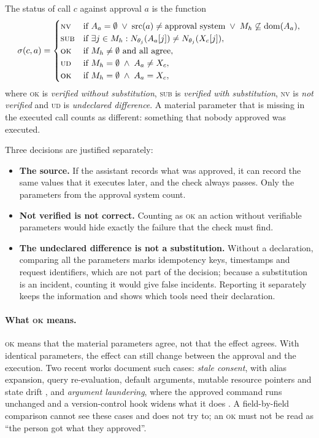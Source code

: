 \documentclass[11pt,a4paper]{article}
\begin{document}
The status of call $c$ against approval $a$ is the function
\begin{equation}
  \sigma(c,a) =
  \begin{cases}
    \textsc{nv} & \text{if } A_a = \emptyset \;\vee\; \mathrm{src}(a) \neq \text{approval system} \;\vee\; M_h \not\subseteq \mathrm{dom}(A_a), \\
    \textsc{sub} & \text{if } \exists j \in M_h : N_{\theta_j}(A_a[j]) \neq N_{\theta_j}(X_c[j]), \\
    \textsc{ok} & \text{if } M_h \neq \emptyset \text{ and all agree}, \\
    \textsc{ud} & \text{if } M_h = \emptyset \;\wedge\; A_a \neq X_c, \\
    \textsc{ok} & \text{if } M_h = \emptyset \;\wedge\; A_a = X_c,
  \end{cases}
\end{equation}
where \textsc{ok} is \emph{verified without substitution}, \textsc{sub} is \emph{verified with substitution},
\textsc{nv} is \emph{not verified} and \textsc{ud} is \emph{undeclared difference}. A material parameter that is
missing in the executed call counts as different: something that nobody approved was executed.

Three decisions are justified separately:
\begin{itemize}
  \item \textbf{The source.} If the assistant records what was approved, it can record the same values that it
    executes later, and the check always passes. Only the parameters from the approval system count.
  \item \textbf{Not verified is not correct.} Counting as \textsc{ok} an action without verifiable parameters
    would hide exactly the failure that the check must find.
  \item \textbf{The undeclared difference is not a substitution.} Without a declaration, comparing all the
    parameters marks idempotency keys, timestamps and request identifiers, which are not part of the decision;
    because a substitution is an incident, counting it would give false incidents. Reporting it separately keeps
    the information and shows which tools need their declaration.
\end{itemize}

\paragraph{What \textsc{ok} means.} \textsc{ok} means that the material parameters agree, not that the effect
agrees. With identical parameters, the effect can still change between the approval and the execution. Two
recent works document such cases: \emph{stale consent}, with alias expansion, query re-evaluation, default
arguments, mutable resource pointers and state drift \cite{staleconsent}, and \emph{argument laundering}, where
the approved command runs unchanged and a version-control hook widens what it does \cite{argumentlaundering}. A
field-by-field comparison cannot see these cases and does not try to; an \textsc{ok} must not be read as ``the
person got what they approved''.
\end{document}
